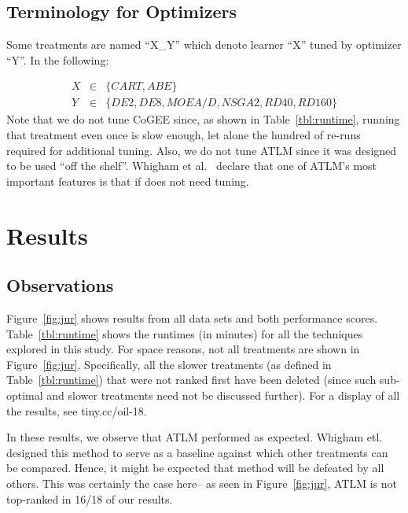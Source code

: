 \subsection{Terminology for Optimizers}

Some treatments are named ``X\_Y'' which  denote learner ``X'' tuned by optimizer ``Y''.
In the following: 

{\small \begin{eqnarray} 
X &\in &\{\mathit{CART},\mathit{ABE}\}\nonumber\\
Y &\in &\{\mathit{DE2},\mathit{DE8},\mathit{MOEA/D},\mathit{NSGA2},\mathit{RD40}, \mathit{RD160}\}\nonumber
\end{eqnarray}}
Note that we do not tune CoGEE since, as shown in Table~\ref{tbl:runtime}, running that treatment even once is slow enough, let alone the hundred of re-runs required for additional tuning. Also, we do not tune ATLM since it was designed to be used ``off the shelf''.  Whigham et al.~\cite{Whigham:2015} declare that one of ATLM's most important features is that if does not need tuning.



\section{Results}
 
\subsection{Observations}
 Figure~\ref{fig:jur} shows results from all
 data sets and both performance scores. 
 Table~\ref{tbl:runtime} shows the runtimes (in minutes) for all
 the techniques explored in this study.
 For space reasons,
 not 
 all treatments are shown in Figure~\ref{fig:jur}. Specifically, all the slower treatments
 (as defined in Table~\ref{tbl:runtime}) that were not ranked first   have been deleted (since such sub-optimal and slower
 treatments need not be discussed further). For a display of all the  results, see tiny.cc/oil-18.


In these results, we observe that ATLM performed as expected. Whigham etl.~\cite{Whigham:2015} designed this method to serve as a baseline against which other treatments can be compared. Hence, it might be
expected that   method will be defeated
by all others. This was certainly the
case here--
 as seen in Figure~\ref{fig:jur}, ATLM is not top-ranked in 16/18 of our results. 

